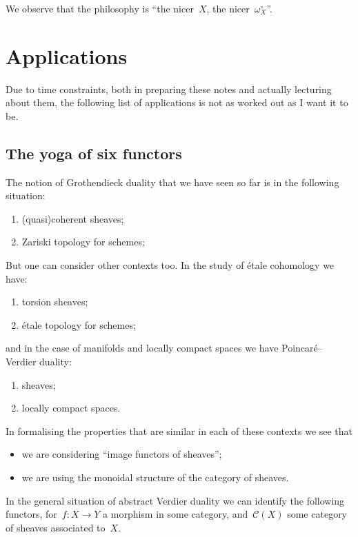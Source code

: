 \documentclass[10pt,a4paper]{article}
\begin{document}
We observe that the philosophy is ``the nicer~$X$, the nicer~$\omega_X^\circ$''.


\section{Applications}
\label{section:applications-grothendieck-duality}
Due to time constraints, both in preparing these notes and actually lecturing about them, the following list of applications is not as worked out as I want it to be.

\subsection{The yoga of six functors}
\label{subsection:six-functors-yoga}
The notion of Grothendieck duality that we have seen so far is in the following situation:
\begin{enumerate}
  \item (quasi)coherent sheaves;
  \item Zariski topology for schemes;
\end{enumerate}
But one can consider other contexts too. In the study of \'etale cohomology we have:
\begin{enumerate}
  \item torsion sheaves;
  \item \'etale topology for schemes;
\end{enumerate}
and in the case of manifolds and locally compact spaces we have Poincar\'e--Verdier duality:
\begin{enumerate}
  \item sheaves;
  \item locally compact spaces.
\end{enumerate}

In formalising the properties that are similar in each of these contexts we see that
\begin{itemize}
  \item we are considering ``image functors of sheaves'';
  \item we are using the monoidal structure of the category of sheaves.
\end{itemize}
In the general situation of abstract Verdier duality we can identify the following functors, for~$f\colon X\to Y$ a morphism in some category, and~$\mathcal{C}(X)$ some category of sheaves associated to~$X$.
\end{document}
